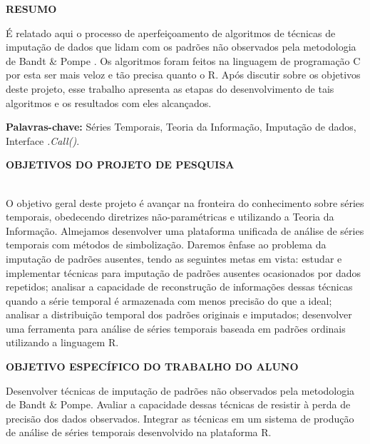 \documentclass{article}
\begin{document}
\newpage
\begin{center}
\textbf{\large{RESUMO}}

\hrulefill

\end{center}

É relatado aqui o processo de aperfeiçoamento de algoritmos de técnicas de imputação de dados que lidam com os padrões não observados pela metodologia de Bandt \& Pompe \cite{bandt2002permutation}. Os algoritmos foram feitos na linguagem de programação C por esta ser mais veloz e tão precisa quanto o R. Após discutir sobre os objetivos deste projeto, esse trabalho apresenta as etapas do desenvolvimento de tais algoritmos e os resultados com eles alcançados.


\textbf{Palavras-chave:} Séries Temporais, Teoria da Informação, Imputação de dados, Interface \textit{.Call()}.
 
\newpage
\begin{center}
\textbf{\large{OBJETIVOS DO PROJETO DE PESQUISA}}\\
\hrulefill \\
\end{center}
          
O objetivo geral deste projeto é avançar na fronteira do conhecimento sobre séries temporais, obedecendo diretrizes não-paramétricas e utilizando a Teoria da Informação.
Almejamos desenvolver uma plataforma unificada de análise de séries temporais com métodos de simbolização. Daremos ênfase ao problema da imputação de padrões ausentes, tendo as seguintes metas em vista: estudar e implementar técnicas para imputação de padrões ausentes ocasionados por dados repetidos; analisar a capacidade de reconstrução de informações dessas técnicas quando a série temporal é armazenada com menos precisão do que a ideal; analisar a distribuição temporal dos padrões originais e imputados; desenvolver uma ferramenta para análise de séries temporais baseada em padrões ordinais utilizando a linguagem R.
    
\newpage
\begin{center}
\textbf{\large{OBJETIVO ESPECÍFICO DO TRABALHO DO ALUNO}}

\hrulefill 

\end{center}
    
Desenvolver técnicas de imputação de padrões não observados pela metodologia de Bandt \& Pompe. Avaliar a capacidade dessas técnicas de resistir à perda de precisão dos dados observados. Integrar as técnicas em um sistema de produção de análise de séries temporais desenvolvido na plataforma R.
    
\end{document}
